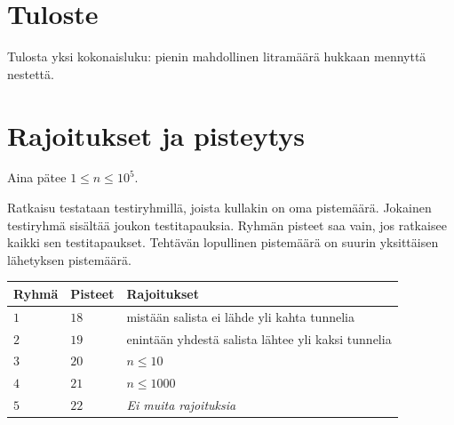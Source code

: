 \section*{Tuloste}

Tulosta yksi kokonaisluku: pienin mahdollinen litramäärä hukkaan mennyttä nestettä.

\section*{Rajoitukset ja pisteytys}

Aina pätee
$1\leq n\leq 10^5$. %

Ratkaisu testataan testiryhmillä, joista kullakin on oma pistemäärä.
Jokainen testiryhmä sisältää joukon testitapauksia.
Ryhmän pisteet saa vain, jos ratkaisee kaikki sen testitapaukset.
Tehtävän lopullinen pistemäärä on suurin yksittäisen lähetyksen pistemäärä.

\medskip
\begin{tabular}{lll}
Ryhmä & Pisteet & Rajoitukset \\\hline
  $1$ & $18$ & mistään salista ei lähde yli kahta tunnelia \\
  $2$ & $19$ & enintään yhdestä salista lähtee yli kaksi tunnelia \\
  $3$ & $20$ & $n\leq 10$\\
  $4$ & $21$ & $n\leq 1000$\\
  $5$ & $22$ & \emph{Ei muita rajoituksia}
\end{tabular}
